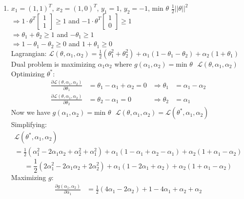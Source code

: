 \documentclass[11pt]{article}
\newcommand{\solution}[1]{{{\color{blue}{\bf Solution:} {#1}}}}
\begin{document}
\begin{enumerate}
\item
\solution{
$x_1 = (1, 1)^T$, $x_2 = (1, 0)^T$, $y_1 = 1$, $y_2 = -1$, min $\theta$ $\frac{1}{2}||\theta||^2$ \\
$\Rightarrow 1\cdot \theta^T \begin{bmatrix} 1 \\ 1 \end{bmatrix} \geq 1$ and $-1\cdot \theta^T \begin{bmatrix} 1 \\ 0 \end{bmatrix} \geq 1$ \\
$\Rightarrow \theta_1 + \theta_2 \geq 1$ and $-\theta_1 \geq 1$ \\
$\Rightarrow 1 - \theta_1 - \theta_2 \geq 0$ and $1 + \theta_1 \geq 0$ \\
Lagrangian: $\mathcal{L}(\theta, \alpha_1, \alpha_2) = \frac{1}{2}(\theta_1^2 + \theta_2^2) + \alpha_1(1-\theta_1 - \theta_2) + \alpha_2(1 + \theta_1)$ \\
Dual problem is maximizing $\alpha_1 \alpha_2$ where $g(\alpha_1, \alpha_2) = \text{min }\theta\text{ } \mathcal{L}(\theta, \alpha_1, \alpha_2)$ \\
Optimizing $\theta^*$: \\
\begin{align}
\frac{\partial \mathcal{L}(\theta, \alpha_1, \alpha_2)}{\partial\theta_1} &= \theta_1 - \alpha_1 + \alpha_2 = 0 &\Rightarrow \theta_1 &= \alpha_1 - \alpha_2 \\
\frac{\partial \mathcal{L}(\theta, \alpha_1, \alpha_2)}{\partial\theta_2} &= \theta_2 - \alpha_1 = 0 &\Rightarrow \theta_2 &= \alpha_1
\end{align}
Now we have $g(\alpha_1, \alpha_2) = \text{min }\theta\text{ } \mathcal{L}(\theta, \alpha_1, \alpha_2) = \mathcal{L}(\theta^*, \alpha_1, \alpha_2)$ \\
Simplifying:
\begin{multline}
\mathcal{L}(\theta^*, \alpha_1, \alpha_2) \\ = \frac{1}{2}(\alpha_1^2 - 2\alpha_1\alpha_2 + \alpha_2^2+\alpha_1^2)+\alpha_1(1-\alpha_1+\alpha_2-\alpha_1)+\alpha_2(1+\alpha_1-\alpha_2)
\end{multline}
\begin{equation}
= \frac{1}{2}(2\alpha_1^2-2\alpha_1\alpha_2+2\alpha_2^2)+\alpha_1(1-2\alpha_1+\alpha_2)+\alpha_2(1+\alpha_1-\alpha_2)
\end{equation}
Maximizing $g$:
\begin{align}
\frac{\partial g(\alpha_1, \alpha_2)}{\partial \alpha_1} &= \frac{1}{2}(4\alpha_1-2\alpha_2)+1-4\alpha_1+\alpha_2+\alpha_2 \\

\end{align}}
\end{enumerate}
\end{document}
